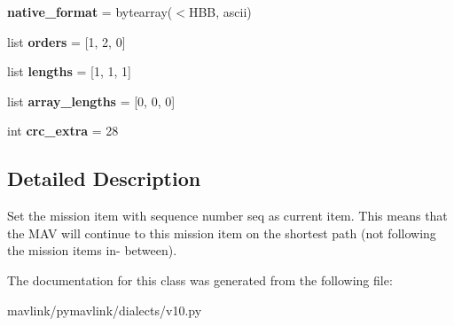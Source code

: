 \begin{DoxyCompactItemize}
{\bfseries native\+\_\+format} = bytearray(\textquotesingle{}$<$H\+BB\textquotesingle{}, \textquotesingle{}ascii\textquotesingle{})
\item 
\mbox{\label{classpymavlink_1_1dialects_1_1v10_1_1MAVLink__mission__set__current__message_abc8299cb1a5891da6d65264cd5bd8e87}} 
list {\bfseries orders} = \mbox{[}1, 2, 0\mbox{]}
\item 
\mbox{\label{classpymavlink_1_1dialects_1_1v10_1_1MAVLink__mission__set__current__message_adb2af83a4fde3ab5374fdd77bb525e7a}} 
list {\bfseries lengths} = \mbox{[}1, 1, 1\mbox{]}
\item 
\mbox{\label{classpymavlink_1_1dialects_1_1v10_1_1MAVLink__mission__set__current__message_af8eaafbf7b544494ec5a7b8e4f1390a9}} 
list {\bfseries array\+\_\+lengths} = \mbox{[}0, 0, 0\mbox{]}
\item 
\mbox{\label{classpymavlink_1_1dialects_1_1v10_1_1MAVLink__mission__set__current__message_ae6ad9c4352bb08144ed96730489f3932}} 
int {\bfseries crc\+\_\+extra} = 28
\end{DoxyCompactItemize}


\subsection{Detailed Description}
\begin{DoxyVerb}Set the mission item with sequence number seq as current item.
This means that the MAV will continue to this mission item on
the shortest path (not following the mission items in-
between).
\end{DoxyVerb}
 

The documentation for this class was generated from the following file\+:\begin{DoxyCompactItemize}
\item 
mavlink/pymavlink/dialects/v10.\+py\end{DoxyCompactItemize}
